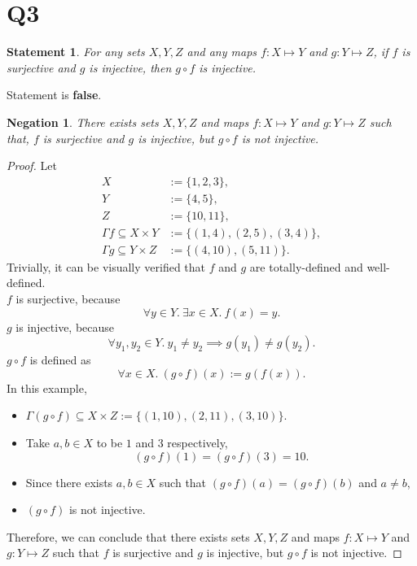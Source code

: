 \documentclass[12pt]{article}
\newtheorem*{stmt}{Statement}
\newtheorem*{negstmt}{Negation}
\begin{document}
\section*{Q3}
\begin{stmt}
    For any sets $X,Y,Z$ and any maps $f:X\mapsto Y$ and $g:Y\mapsto Z$,
    if $f$ is surjective and $g$ is injective, then $g\circ f$ is injective.
\end{stmt}
Statement is \textbf{false}.
\begin{negstmt}
    There exists sets $X,Y,Z$ and maps $f:X\mapsto Y$ and $g:Y\mapsto Z$ such that,
    $f$ is surjective and $g$ is injective, but $g\circ f$ is not injective.
\end{negstmt}
\begin{proof}
    Let
    \begin{align*}
        X &:= \{1, 2, 3\},\\
        Y &:=\{4, 5\},\\
        Z &:=\{10, 11\},\\
        \Gamma f \subseteq X\times Y &:=\{(1,4),(2,5),(3,4)\},\\
        \Gamma g \subseteq Y\times Z &:=\{(4,10), (5,11)\}.
    \end{align*}
    Trivially, it can be visually verified that $f$ and $g$ are totally-defined and well-defined.\\
    $f$ is surjective, because
        $$\forall y \in Y.~ \exists x \in X.~ f(x) = y.$$
    $g$ is injective, because
        $$\forall y_1,y_2 \in Y.~ y_1 \neq y_2 \implies g(y_1) \neq g(y_2).$$
    $g\circ f$ is defined as $$\forall x \in X.~ (g\circ f)(x) := g(f(x)).$$
    In this example,
    \begin{itemize}[label={}]
        \item $\Gamma (g \circ f) \subseteq X \times Z := \{(1,10),(2,11),(3,10)\}$.
        \item Take $a,b \in X$ to be $1$ and $3$ respectively,
            $$(g \circ f)(1) = (g \circ f)(3) = 10.$$
        \item Since there exists $a,b \in X$ such that $(g\circ f)(a) = (g \circ f)(b)$ and $a \neq b$,
        \item $(g \circ f)$ is not injective.
    \end{itemize}
    Therefore, we can conclude that there exists sets $X,Y,Z$ and maps $f:X\mapsto Y$ and $g:Y\mapsto Z$ such that $f$ is surjective and $g$ is injective, but $g\circ f$ is not injective.
\end{proof}
\newpage
\end{document}

